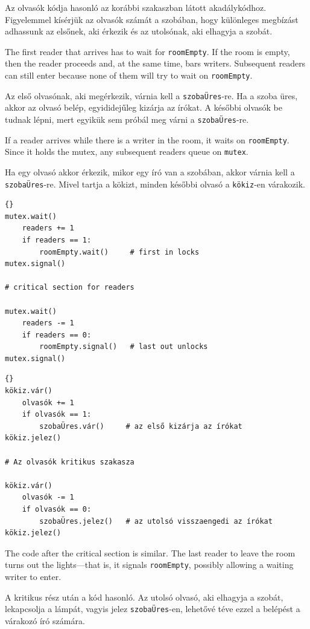 \documentclass{book}
\begin{document}
Az olvasók kódja hasonló az korábbi szakaszban látott akadálykódhoz.
Figyelemmel kísérjük az olvasók számát a szobában, hogy különleges
megbízást adhassunk az elsőnek, aki érkezik és az utolsónak,
aki elhagyja a szobát. 

The first reader that arrives has to wait for {\tt roomEmpty}.
If the room is empty, then the reader proceeds and, at the
same time, bars writers.  Subsequent readers can still enter
because none of them will try to wait on {\tt roomEmpty}.

Az első olvasónak, aki megérkezik, várnia kell a {\tt szobaÜres}-re.
Ha a szoba üres, akkor az olvasó belép, egyididejűleg kizárja
az írókat.
A későbbi olvasók be tudnak lépni, mert egyikük sem próbál
meg várni a {\tt szobaÜres}-re.

If a reader arrives while there is a writer in the room,
it waits on {\tt roomEmpty}.  Since it holds the mutex, any
subsequent readers queue on {\tt mutex}.

Ha egy olvasó akkor érkezik, mikor egy író van a szobában,
akkor várnia kell a {\tt szobaÜres}-re. Mivel tartja a kökizt,
minden későbbi olvasó a {\tt kökiz}-en várakozik.

\begin{lstlisting}[title={Readers solution}]{}
mutex.wait()
    readers += 1
    if readers == 1:
        roomEmpty.wait()     # first in locks
mutex.signal()

# critical section for readers

mutex.wait()
    readers -= 1
    if readers == 0:
        roomEmpty.signal()   # last out unlocks
mutex.signal()
\end{lstlisting}

\begin{lstlisting}[title={Olvasók megoldás}]{}
kökiz.vár()
    olvasók += 1
    if olvasók == 1:
        szobaÜres.vár()     # az első kizárja az írókat
kökiz.jelez()

# Az olvasók kritikus szakasza

kökiz.vár()
    olvasók -= 1
    if olvasók == 0:
        szobaÜres.jelez()   # az utolsó visszaengedi az írókat
kökiz.jelez()
\end{lstlisting}

The code after the critical section is similar.  The last reader
to leave the room turns out the lights---that is, it signals
{\tt roomEmpty}, possibly allowing a waiting writer to enter.

A kritikus rész után a kód hasonló. Az utolsó olvasó, aki elhagyja a szobát,
lekapcsolja a lámpát, vagyis jelez {\tt szobaÜres}-en, lehetővé téve ezzel
a belépést a várakozó író számára.
\end{document}
